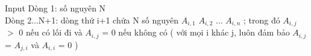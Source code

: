 Input  
Dòng 1: số nguyên N   
\\   Dòng 2...N+1: dòng thứ i+1 chứa N số nguyên $A_{i,1}$   $A_{i,2}$   ... $A_{i,n}$   ; trong đó $A_{i,j}$   $>$ 0 nếu có lối đi và $A_{i,j}$   = 0 nếu không có ( với mọi i khác j, luôn đảm bảo $A_{i,j}$   = $A_{j,i}$   và $A_{i,i}$   = 0 )